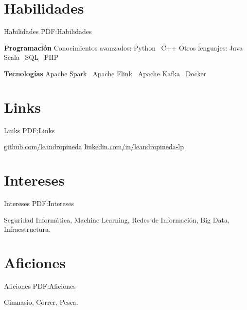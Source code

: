 \documentclass[letterpaper,MMMyyyy,nonstop]{simpleresumecv}
\begin{document}
\begin{body}
\section
{Habilidades}
{Habilidades}
{PDF:Habilidades}

\textbf{Programación}
\BulletItem
Conocimientos avanzados: Python \SubBulletSymbol\, C++
\BulletItem
Otros lenguajes: Java \SubBulletSymbol\, Scala \SubBulletSymbol\, SQL \SubBulletSymbol\, PHP

\textbf{Tecnologías}
\BulletItem Apache Spark \SubBulletSymbol\, Apache Flink \SubBulletSymbol\, Apache Kafka \SubBulletSymbol\, Docker


\section
{Links}
{Links}
{PDF:Links}

\BulletItem
\href{https://github.com/leandropineda}{github.com/leandropineda}
\BulletItem
\href{https://www.linkedin.com/in/leandropineda-lp}{linkedin.com/in/leandropineda-lp}


\section
{Intereses}
{Intereses}
{PDF:Intereses}

Seguridad Informática, Machine Learning, Redes de Información, Big Data, Infraestructura.



\section
{Aficiones}
{Aficiones}
{PDF:Aficiones}

Gimnasio, Correr, Pesca.



\end{body}
\end{document}
